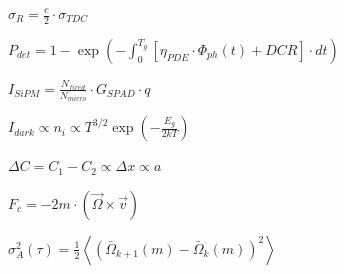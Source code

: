 \documentclass[12pt]{article}
\begin{document}
\vspace*{\fill}
\begin{center}$\sigma_R = \frac{c}{2} \cdot \sigma_{TDC}$\end{center}\vspace*{\fill}\newpage
\vspace*{\fill}
\begin{center}$P_{det} = 1 - \exp\left(-\int_{0}^{T_g} [\eta_{PDE} \cdot \Phi_{ph}(t) + DCR] \cdot dt\right)$\end{center}\vspace*{\fill}\newpage
\vspace*{\fill}
\begin{center}$I_{SiPM} = \frac{N_{fired}}{N_{micro}} \cdot G_{SPAD} \cdot q$\end{center}\vspace*{\fill}\newpage
\vspace*{\fill}
\begin{center}$I_{dark} \propto n_i \propto T^{3/2} \exp\left(-\frac{E_g}{2kT}\right)$\end{center}\vspace*{\fill}\newpage
\vspace*{\fill}
\begin{center}$\Delta C = C_1 - C_2 \propto \Delta x \propto a$\end{center}\vspace*{\fill}\newpage
\vspace*{\fill}
\begin{center}$F_c = -2m \cdot (\vec{\Omega} \times \vec{v})$\end{center}\vspace*{\fill}\newpage
\vspace*{\fill}
\begin{center}$\sigma^2_A(\tau) = \frac{1}{2}\left\langle \left(\bar{\Omega}_{k+1}(m) - \bar{\Omega}_k(m)\right)^2 \right\rangle$\end{center}\vspace*{\fill}
\end{document}
